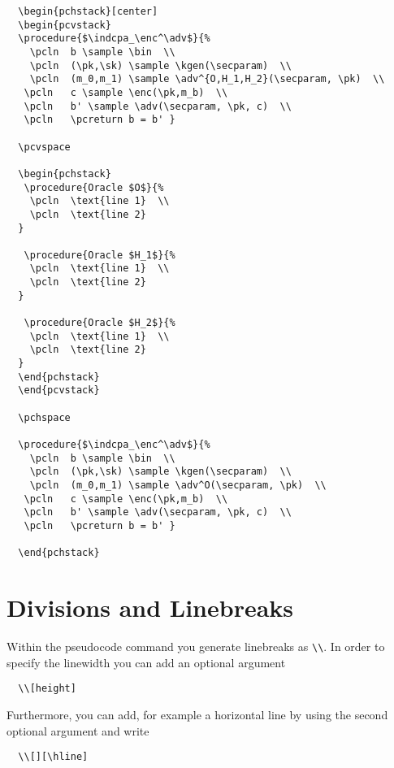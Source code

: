 \documentclass[a4paper]{report}
\begin{document}
  
  \begin{lstlisting}
  \begin{pchstack}[center]
  \begin{pcvstack}
  \procedure{$\indcpa_\enc^\adv$}{%
	\pcln  b \sample \bin  \\
	\pcln  (\pk,\sk) \sample \kgen(\secparam)  \\
	\pcln  (m_0,m_1) \sample \adv^{O,H_1,H_2}(\secparam, \pk)  \\
   \pcln   c \sample \enc(\pk,m_b)  \\
   \pcln   b' \sample \adv(\secparam, \pk, c)  \\
   \pcln   \pcreturn b = b' }
  
  \pcvspace
  
  \begin{pchstack}
   \procedure{Oracle $O$}{%
	\pcln  \text{line 1}  \\
	\pcln  \text{line 2}  
  }
  
   \procedure{Oracle $H_1$}{%
	\pcln  \text{line 1}  \\
	\pcln  \text{line 2}  
  }
  
   \procedure{Oracle $H_2$}{%
	\pcln  \text{line 1}  \\
	\pcln  \text{line 2}  
  }
  \end{pchstack}
  \end{pcvstack}
  
  \pchspace
  
  \procedure{$\indcpa_\enc^\adv$}{%
	\pcln  b \sample \bin  \\
	\pcln  (\pk,\sk) \sample \kgen(\secparam)  \\
	\pcln  (m_0,m_1) \sample \adv^O(\secparam, \pk)  \\
   \pcln   c \sample \enc(\pk,m_b)  \\
   \pcln   b' \sample \adv(\secparam, \pk, c)  \\
   \pcln   \pcreturn b = b' }
  
  \end{pchstack}
  \end{lstlisting}
  
  \section{Divisions and Linebreaks}
  Within the pseudocode command you generate linebreaks as \lstinline$\\$. In order to specify the linewidth you can add an optional argument
  \begin{lstlisting}
  \\[height]
  \end{lstlisting}
  Furthermore, you can add, for example a horizontal line by using the second optional argument and write
  \begin{lstlisting}
  \\[][\hline]
  \end{lstlisting}
  
\end{document}
